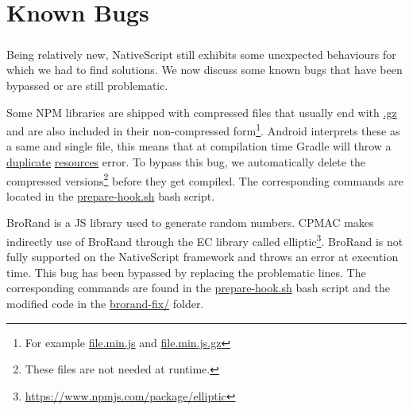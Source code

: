 \chapter{Known Bugs}

\paragraph{}
Being relatively new, NativeScript still exhibits some unexpected behaviours for which we had to find solutions. We now discuss some known bugs that have been bypassed or are still problematic.

\begin{description}[style=nextline]
\item[Compressed Files (Android)] Some NPM libraries are shipped with compressed files that usually end with \url{.gz} and are also included in their non-compressed form\footnote{For example \url{file.min.js} and \url{file.min.js.gz}}. Android interprets these as a same and single file, this means that at compilation time Gradle will throw a \url{duplicate} \url{resources} error. To bypass this bug, we automatically delete the compressed versions\footnote{These files are not needed at runtime.} before they get compiled. The corresponding commands are located in the \url{prepare-hook.sh} bash script.

\item[The BroRand Library\footnote{\url{https://www.npmjs.com/package/brorand}}] BroRand is a JS library used to generate random numbers. CPMAC makes indirectly use of BroRand through the EC library called elliptic\footnote{\url{https://www.npmjs.com/package/elliptic}}. BroRand is not fully supported on the NativeScript framework and throws an error at execution time. This bug has been bypassed by replacing the problematic lines. The corresponding commands are found in the \url{prepare-hook.sh} bash script and the modified code in the \url{brorand-fix/} folder.


\end{description}
